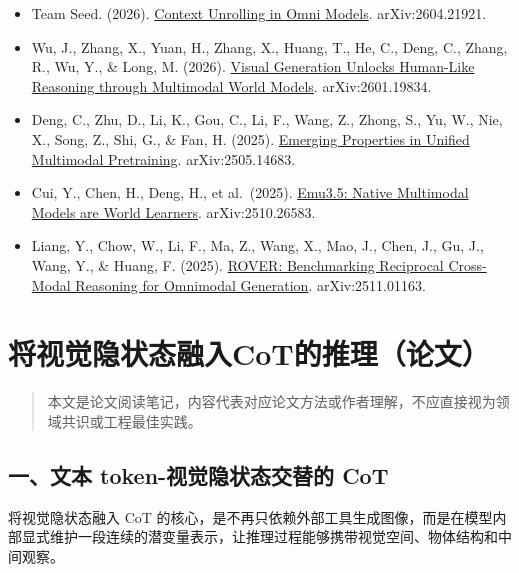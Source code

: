 \begin{itemize}
\tightlist
\item
  Team Seed. (2026). \href{https://arxiv.org/abs/2604.21921}{Context Unrolling in Omni Models}. arXiv:2604.21921.
\item
  Wu, J., Zhang, X., Yuan, H., Zhang, X., Huang, T., He, C., Deng, C., Zhang, R., Wu, Y., \& Long, M. (2026). \href{https://arxiv.org/abs/2601.19834}{Visual Generation Unlocks Human-Like Reasoning through Multimodal World Models}. arXiv:2601.19834.
\item
  Deng, C., Zhu, D., Li, K., Gou, C., Li, F., Wang, Z., Zhong, S., Yu, W., Nie, X., Song, Z., Shi, G., \& Fan, H. (2025). \href{https://arxiv.org/abs/2505.14683}{Emerging Properties in Unified Multimodal Pretraining}. arXiv:2505.14683.
\item
  Cui, Y., Chen, H., Deng, H., et al.~(2025). \href{https://arxiv.org/abs/2510.26583}{Emu3.5: Native Multimodal Models are World Learners}. arXiv:2510.26583.
\item
  Liang, Y., Chow, W., Li, F., Ma, Z., Wang, X., Mao, J., Chen, J., Gu, J., Wang, Y., \& Huang, F. (2025). \href{https://arxiv.org/abs/2511.01163}{ROVER: Benchmarking Reciprocal Cross-Modal Reasoning for Omnimodal Generation}. arXiv:2511.01163.
\end{itemize}

\clearpage

\hypertarget{ux5c06ux89c6ux89c9ux9690ux72b6ux6001ux878dux5165cotux7684ux63a8ux7406ux8bbaux6587}{%
\section{将视觉隐状态融入CoT的推理（论文）}\label{ux5c06ux89c6ux89c9ux9690ux72b6ux6001ux878dux5165cotux7684ux63a8ux7406ux8bbaux6587}}

\begin{quote}
本文是论文阅读笔记，内容代表对应论文方法或作者理解，不应直接视为领域共识或工程最佳实践。
\end{quote}

\hypertarget{ux4e00ux6587ux672c-token-ux89c6ux89c9ux9690ux72b6ux6001ux4ea4ux66ffux7684-cot}{%
\subsection{一、文本 token-视觉隐状态交替的 CoT}\label{ux4e00ux6587ux672c-token-ux89c6ux89c9ux9690ux72b6ux6001ux4ea4ux66ffux7684-cot}}

将视觉隐状态融入 CoT 的核心，是不再只依赖外部工具生成图像，而是在模型内部显式维护一段连续的潜变量表示，让推理过程能够携带视觉空间、物体结构和中间观察。

